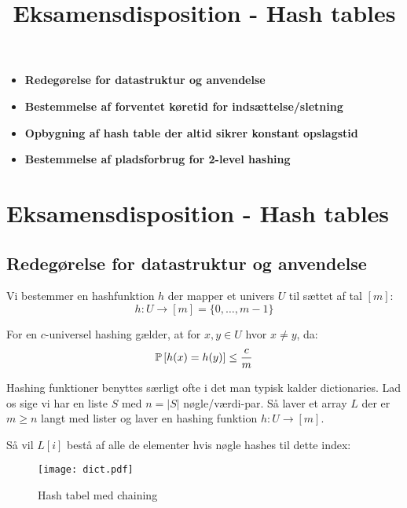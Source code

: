 
\title{Eksamensdisposition - Hash tables}


\maketitle

\begin{itemize}
  \item \textbf{Redegørelse for datastruktur og anvendelse}
  \item \textbf{Bestemmelse af forventet køretid for indsættelse/sletning}
  \item \textbf{Opbygning af hash table der altid sikrer konstant opslagstid}
  \item \textbf{Bestemmelse af pladsforbrug for 2-level hashing}
\end{itemize}


\newpage
\section{Eksamensdisposition - Hash tables}
\subsection{Redegørelse for datastruktur og anvendelse}
Vi bestemmer en hashfunktion $h$ der mapper et univers $U$ til sættet af tal $[m]$:
$$
  h : U \rightarrow [m] = \{0, \dots, m-1 \}
$$

For en $c$-universel hashing gælder, at for $x, y \in U$ hvor $x \neq y$, da:
$$
\P{h(x) = h(y)} \leq \frac{c}{m}
$$

Hashing funktioner benyttes særligt ofte i det man typisk kalder dictionaries. Lad os sige vi har en liste $S$ med $n = |S|$ nøgle/værdi-par. Så laver et array $L$ der er $m \geq n$ langt med lister og laver en hashing funktion $h : U \rightarrow [m]$.

Så vil $L[i]$ bestå af alle de elementer hvis nøgle hashes til dette index:
\begin{figure}[H]
  \begin{center}
  \texttt{[image: dict.pdf]}
  \end{center}
  \caption{Hash tabel med chaining}
  \label{fig:hash}
\end{figure}



